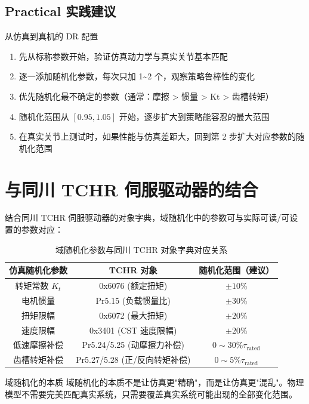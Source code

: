 \subsection{Practical 实践建议}

\begin{debugbox}{从仿真到真机的 DR 配置}
\begin{enumerate}
    \item 先从标称参数开始，验证仿真动力学与真实关节基本匹配
    \item 逐一添加随机化参数，每次只加 1\textasciitilde 2 个，观察策略鲁棒性的变化
    \item 优先随机化最不确定的参数（通常：摩擦 > 惯量 > Kt > 齿槽转矩）
    \item 随机化范围从 \([0.95, 1.05]\) 开始，逐步扩大到策略能容忍的最大范围
    \item 在真实关节上测试时，如果性能与仿真差距大，回到第 2 步扩大对应参数的随机化范围
\end{enumerate}
\end{debugbox}

\section{与同川 TCHR 伺服驱动器的结合}

结合同川 TCHR 伺服驱动器的对象字典，域随机化中的参数可与实际可读/可设置的参数对应：

\begin{table}[H]
\centering
\caption{域随机化参数与同川 TCHR 对象字典对应关系}
\begin{tabular}{c|c|c}
\toprule
\textbf{仿真随机化参数} & \textbf{TCHR 对象} & \textbf{随机化范围（建议）} \\
\midrule
转矩常数 \(K_t\) & 0x6076 (额定扭矩) & \(\pm 10\%\) \\
电机惯量 & Pr5.15 (负载惯量比) & \(\pm 30\%\) \\
扭矩限幅 & 0x6072 (最大扭矩) & \(\pm 20\%\) \\
速度限幅 & 0x3401 (CST 速度限幅) & \(\pm 20\%\) \\
低速摩擦补偿 & Pr5.24/5.25 (动摩擦力补偿) & \(0 \sim 30\% \tau_{\text{rated}}\) \\
齿槽转矩补偿 & Pr5.27/5.28 (正/反向转矩补偿) & \(0 \sim 5\% \tau_{\text{rated}}\) \\
\bottomrule
\end{tabular}
\end{table}

\begin{keyinsight}{域随机化的本质}
    域随机化的本质不是让仿真更"精确"，而是让仿真更"混乱"。物理模型不需要完美匹配真实系统，只需要覆盖真实系统可能出现的全部变化范围。
\end{keyinsight}

